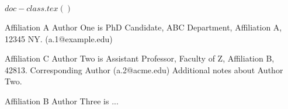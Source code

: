 %
$doc-class.tex()$



\author{Author One}
       {Affiliation A}
       {Author One is PhD Candidate, ABC Department, Affiliation A, 12345 NY. (a.1@example.edu)}
       
\author{Author Two}
       {Affiliation C}
       {Author Two is Assistant Professor, Faculty of Z, Affiliation B, 42813. Corresponding Author (a.2@acme.edu) Additional notes about Author Two.}
       
\author{Author Three}
       {Affiliation B}
       {Author Three is ...}


